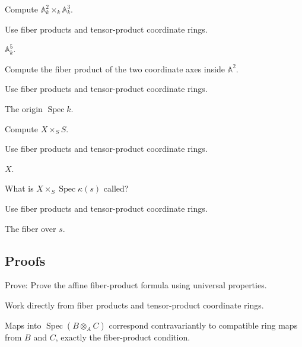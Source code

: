 \begin{exercise}\label{exr:vi23-expand-02}
Compute $\mathbb A^2_k\times_k\mathbb A^3_k$.
\end{exercise}
\begin{hint}
Use fiber products and tensor-product coordinate rings.
\end{hint}
\begin{solution}
$\mathbb A^5_k$.
\end{solution}

\begin{exercise}\label{exr:vi23-expand-03}
Compute the fiber product of the two coordinate axes inside $\mathbb A^2$.
\end{exercise}
\begin{hint}
Use fiber products and tensor-product coordinate rings.
\end{hint}
\begin{solution}
The origin $\operatorname{Spec}k$.
\end{solution}

\begin{exercise}[Identity]\label{exr:vi23-expand-04}
Compute $X\times_S S$.
\end{exercise}
\begin{hint}
Use fiber products and tensor-product coordinate rings.
\end{hint}
\begin{solution}
$X$.
\end{solution}

\begin{exercise}\label{exr:vi23-expand-05}
What is $X\times_S\operatorname{Spec}\kappa(s)$ called?
\end{exercise}
\begin{hint}
Use fiber products and tensor-product coordinate rings.
\end{hint}
\begin{solution}
The fiber over $s$.
\end{solution}

\subsection*{Proofs}

\begin{exercise}\label{exr:vi23-expand-06}
Prove: Prove the affine fiber-product formula using universal properties.
\end{exercise}
\begin{hint}
Work directly from fiber products and tensor-product coordinate rings.
\end{hint}
\begin{solution}
Maps into $\operatorname{Spec}(B\otimes_A C)$ correspond contravariantly to compatible ring maps from $B$ and $C$, exactly the fiber-product condition.
\end{solution}

